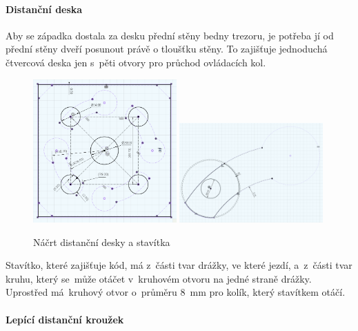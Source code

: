 \paragraph{Distanční deska}

Aby se západka dostala za desku přední stěny bedny trezoru, je potřeba jí od přední stěny dveří posunout právě o tloušťku stěny. To zajišťuje jednoduchá čtvercová deska jen s~pěti otvory
pro průchod ovládacích kol.

\begin{figure}[h]
	\centering
    \includegraphics[width=0.49\textwidth]{kapitoly/obrazky/M3/distancka.png}
    \includegraphics[width=0.49\textwidth]{kapitoly/obrazky/M3/kamen.png}
    \caption{Náčrt distanční desky a stavítka}
    \label{fig:M3-kamen}
    \label{fig:M3-distancka}
\end{figure}

Stavítko, které zajišťuje kód, má z~části tvar drážky, ve které jezdí, a~z~části tvar kruhu, který se~může otáčet v~kruhovém otvoru na jedné straně drážky.
Uprostřed má~kruhový otvor o~průměru 8~mm pro kolík, který stavítkem otáčí.

\paragraph{Lepící distanční kroužek}

